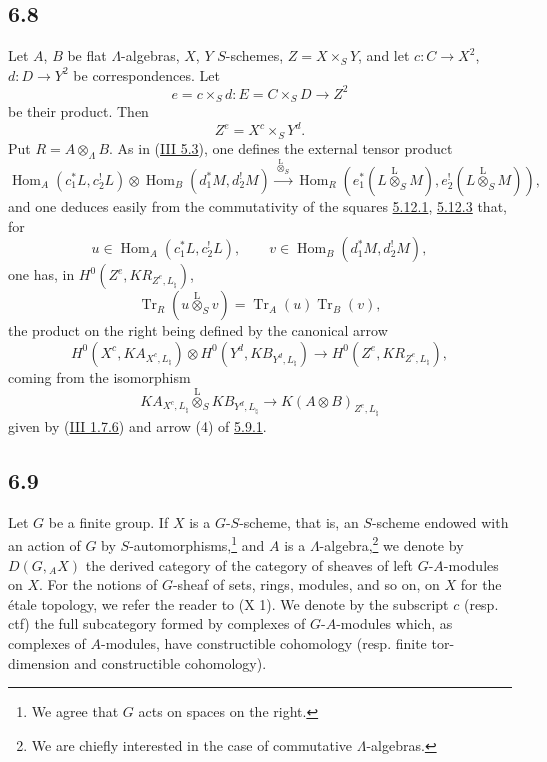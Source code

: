 \documentclass[11pt]{article}
\DeclareMathOperator{\Hom}{Hom}
\providecommand{\Tr}{\operatorname{Tr}}
\providecommand{\Tr}{\operatorname{Tr}}
\providecommand{\lten}{\overset{\mathrm L}{\otimes}}
\providecommand{\Tr}{\operatorname{Tr}}
\providecommand{\Hom}{\operatorname{Hom}}
\providecommand{\lten}{\overset{\mathrm L}{\otimes}}
\providecommand{\lten}{\overset{\mathrm L}{\otimes}}
\providecommand{\Tr}{\operatorname{Tr}}
\providecommand{\lten}{\overset{\mathrm L}{\otimes}}
\providecommand{\lten}{\overset{\mathrm L}{\otimes}}
\providecommand{\lten}{\overset{\mathrm L}{\otimes}}
\providecommand{\Hom}{\operatorname{Hom}}
\providecommand{\Tr}{\operatorname{Tr}}
\providecommand{\lten}{\overset{\mathrm L}{\otimes}}
\begin{document}
\subsection*{6.8}\label{sga5:IIIB:subsection:6.8}
Let $A$, $B$ be flat $\Lambda$-algebras, $X$, $Y$ $S$-schemes, $Z=X\times_SY$, and let $c:C\to X^2$, $d:D\to Y^2$ be correspondences. Let
\[
e=c\times_Sd:E=C\times_SD\longrightarrow Z^2
\]
be their product. Then
\[
Z^e=X^c\times_SY^d.
\]
Put $R=A\otimes_{\Lambda}B$. As in (\hyperref[sga5:III:subsection:5.3]{III 5.3}), one defines the external tensor product
\begin{equation}
\Hom_A(c_1^*L,c_2^!L)\otimes \Hom_B(d_1^*M,d_2^!M)
\xrightarrow{\ \lten_S\ }
\Hom_R(e_1^*(L\lten_SM),e_2^!(L\lten_SM)),
\tag{6.8.1}\label{sga5:IIIB:equation:6.8.1}
\end{equation}
and one deduces easily from the commutativity of the squares \hyperref[sga5:IIIB:equation:5.12.1]{5.12.1}, \hyperref[sga5:IIIB:equation:5.12.3]{5.12.3} that, for
\[
u\in\Hom_A(c_1^*L,c_2^!L),\qquad v\in\Hom_B(d_1^*M,d_2^!M),
\]
one has, in $H^0(Z^e,KR_{Z^e,L_{\natural}})$,
\begin{equation}
\Tr_R(u\lten_Sv)=\Tr_A(u)\Tr_B(v),
\tag{6.8.2}\label{sga5:IIIB:equation:6.8.2}
\end{equation}
the product on the right being defined by the canonical arrow
\begin{equation}
H^0(X^c,KA_{X^c,L_{\natural}})\otimes
H^0(Y^d,KB_{Y^d,L_{\natural}})
\longrightarrow
H^0(Z^e,KR_{Z^e,L_{\natural}}),
\tag{6.8.3}\label{sga5:IIIB:equation:6.8.3}
\end{equation}
coming from the isomorphism
\[
KA_{X^c,L_{\natural}}\lten_S KB_{Y^d,L_{\natural}}\longrightarrow K(A\otimes B)_{Z^e,L_{\natural}}
\]
given by (\hyperref[sga5:III:equation:1.7.6]{III 1.7.6}) and arrow (4) of \hyperref[sga5:IIIB:equation:5.9.1]{5.9.1}.

\subsection*{6.9}\label{sga5:IIIB:subsection:6.9}
Let $G$ be a finite group. If $X$ is a $G$-$S$-scheme, that is, an $S$-scheme endowed with an action of $G$ by $S$-automorphisms,\footnote{We agree that $G$ acts on spaces on the right.} and $A$ is a $\Lambda$-algebra,\footnote{We are chiefly interested in the case of commutative $\Lambda$-algebras.} we denote by $D(G,{}_AX)$ the derived category of the category of sheaves of left $G$-$A$-modules on $X$. For the notions of $G$-sheaf of sets, rings, modules, and so on, on $X$ for the étale topology, we refer the reader to (X 1). We denote by the subscript $c$ (resp. ctf) the full subcategory formed by complexes of $G$-$A$-modules which, as complexes of $A$-modules, have constructible cohomology (resp. finite tor-dimension and constructible cohomology).
\end{document}
